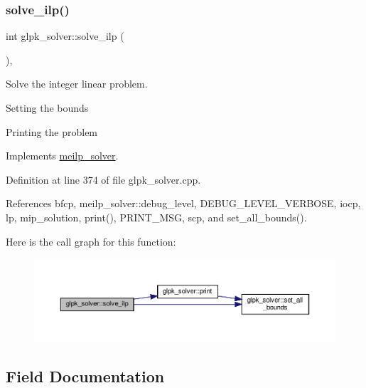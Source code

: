 \subsubsection{\texorpdfstring{solve\+\_\+ilp()}{solve\_ilp()}}
{\footnotesize\ttfamily int glpk\+\_\+solver\+::solve\+\_\+ilp (\begin{DoxyParamCaption}{ }\end{DoxyParamCaption})\hspace{0.3cm}{\ttfamily [override]}, {\ttfamily [virtual]}}



Solve the integer linear problem. 

Setting the bounds

Printing the problem 

Implements \hyperlink{classmeilp__solver_aec926409e78f416d3272cb8f3ef1e1c0}{meilp\+\_\+solver}.



Definition at line 374 of file glpk\+\_\+solver.\+cpp.



References bfcp, meilp\+\_\+solver\+::debug\+\_\+level, D\+E\+B\+U\+G\+\_\+\+L\+E\+V\+E\+L\+\_\+\+V\+E\+R\+B\+O\+SE, iocp, lp, mip\+\_\+solution, print(), P\+R\+I\+N\+T\+\_\+\+M\+SG, scp, and set\+\_\+all\+\_\+bounds().

Here is the call graph for this function\+:
\nopagebreak
\begin{figure}[H]
\begin{center}
\leavevmode
\includegraphics[width=350pt]{db/d0a/classglpk__solver_ad27b82487380811e19a1adc2628f8b07_cgraph}
\end{center}
\end{figure}


\subsection{Field Documentation}
\mbox{\label{classglpk__solver_ae2ecbdbf0db6bd7ddcf7d7b04444c584}} 

